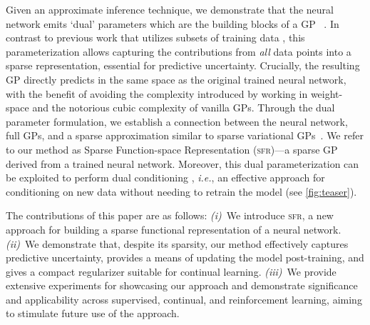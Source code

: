 \documentclass{article} %
\makeatletter
\newcommand{\ie}{\textit{i.e.\@}\xspace}
\newcommand{\our}{\textsc{sfr}\xspace}
\makeatother
\begin{document}
Given an approximate inference technique, we demonstrate that the neural network emits `dual' parameters which are the building blocks of a GP~\cite{csato2002sparse, adam2021dual, chang2020fast} . In contrast to previous work that utilizes subsets of training data \cite{immer2021scalable},
this parameterization allows capturing the contributions from {\em all} data points into a sparse representation, essential for predictive uncertainty. Crucially, the resulting GP directly predicts in the same space as the original trained neural network, with the benefit of avoiding the complexity introduced by working in weight-space and the notorious cubic complexity of vanilla GPs.
Through the dual parameter formulation, we establish a connection between the neural network, full GPs, and a sparse approximation similar to sparse variational GPs~\cite{titsias2009variational}. We refer to our method as Sparse Function-space Representation (\our)---a sparse GP derived from a trained neural network. Moreover, this dual parameterization can be exploited to perform dual conditioning \citep{chang2022fantasizing}, \ie, an effective approach for conditioning on new data without needing to retrain the model (see \cref{fig:teaser}).



The contributions of this paper are as follows:
%
{\em (i)}~We introduce \our, a new approach for building a sparse functional representation of a neural network.
{\em (ii)}~We demonstrate that, despite its sparsity, our method effectively captures predictive uncertainty, provides a means of updating the model post-training, and gives a compact regularizer suitable for continual learning.
{\em (iii)}~We provide extensive experiments for showcasing our approach and demonstrate significance and applicability across supervised, continual, and reinforcement learning, aiming to stimulate future use of the approach.
\end{document}
